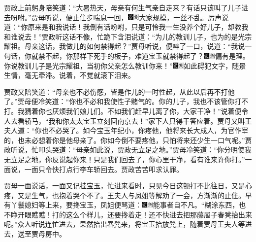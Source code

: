 贾政上前躬身陪笑道：``大暑热天，母亲有何生气亲自走来？有话只该叫了儿子进去吩咐。''贾母听说，便止住步喘息一回，{\includegraphics[width=3mm]{../Images/00006}\includegraphics[width=3mm]{../Images/00011}\footnotesize \kaishu 大家规模，一丝不乱。}厉声说道：``你原来是和我说话！我倒有话吩咐，只是可怜我一生没养个好儿子，却教我和谁说去！''贾政听这话不像，忙跪下含泪说道：``为儿的教训儿子，也为的是光宗耀祖。母亲这话，我做儿的如何禁得起？''贾母听说，便啐了一口，说道：``我说一句话，你就禁不起，你那样下死手的板子，难道宝玉就禁得起了？{\includegraphics[width=3mm]{../Images/00006}\includegraphics[width=3mm]{../Images/00011}\footnotesize \kaishu 偏有是理。}你说教训儿子是光宗耀祖，当初你父亲怎么教训你来！''{\includegraphics[width=3mm]{../Images/00006}\includegraphics[width=3mm]{../Images/00011}\footnotesize \kaishu 如此碍犯文字，随景生情，毫无牵滞。}说着，不觉就滚下泪来。

贾政又陪笑道：``母亲也不必伤感，皆是作儿的一时性起，从此以后再不打他了。''贾母便冷笑道：``你也不必和我使性子赌气的。你的儿子，我也不该管你打不打。我猜着你也厌烦我们娘儿们。不如我们赶早儿离了你，大家干净！''说着便令人去看轿马，``我和你太太宝玉立刻回南京去！''家下人只得干答应着。贾母又叫王夫人道：``你也不必哭了。如今宝玉年纪小，你疼他，他将来长大成人，为官作宰的，也未必想着你是他母亲了。你如今倒不要疼他，只怕将来还少生一口气呢。''贾政听说，忙叩头哭道：``母亲如此说，贾政无立足之地。''贾母冷笑道：``你分明使我无立足之地，你反说起你来！只是我们回去了，你心里干净，看有谁来许你打。''一面说，一面只令快打点行李车轿回去。贾政苦苦叩求认罪。

贾母一面说话，一面又记挂宝玉，忙进来看时，只见今日这顿打不比往日，又是心疼，又是生气，也抱着哭个不了。王夫人与凤姐等解劝了一会，方渐渐的止住。早有丫鬟媳妇等上来，要搀宝玉，凤姐便骂道：{\includegraphics[width=3mm]{../Images/00006}\includegraphics[width=3mm]{../Images/00011}\footnotesize \kaishu 能事者自不凡。}``糊涂东西，也不睁开眼瞧瞧！打的这么个样儿，还要搀着走！还不快进去把那藤屉子春凳抬出来呢。''众人听说连忙进去，果然抬出春凳来，将宝玉抬放凳上，随着贾母王夫人等进去，送至贾母房中。


